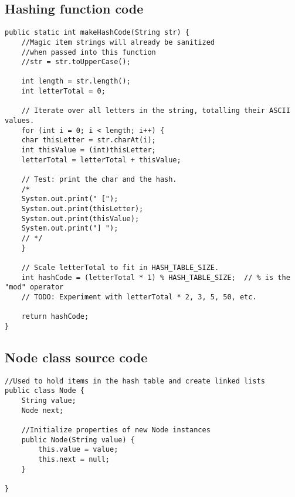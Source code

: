 \documentclass[letterpaper, 10pt,DIV=13]{scrartcl}
\numberwithin{equation}{section} %
\numberwithin{figure}{section} %
\numberwithin{table}{section} %
\begin{document}
\subsection{Hashing function code}
\lstset{numbers=left, numberstyle=\tiny, stepnumber=1, numbersep=5pt, basicstyle=\footnotesize\ttfamily}
\begin{lstlisting}[frame=single, ] 
public static int makeHashCode(String str) {
    //Magic item strings will already be sanitized 
    //when passed into this function
    //str = str.toUpperCase();
    
    int length = str.length();
    int letterTotal = 0;

    // Iterate over all letters in the string, totalling their ASCII values.
    for (int i = 0; i < length; i++) {
    char thisLetter = str.charAt(i);
    int thisValue = (int)thisLetter;
    letterTotal = letterTotal + thisValue;

    // Test: print the char and the hash.
    /*
    System.out.print(" [");
    System.out.print(thisLetter);
    System.out.print(thisValue);
    System.out.print("] ");
    // */
    }

    // Scale letterTotal to fit in HASH_TABLE_SIZE.
    int hashCode = (letterTotal * 1) % HASH_TABLE_SIZE;  // % is the "mod" operator
    // TODO: Experiment with letterTotal * 2, 3, 5, 50, etc.

    return hashCode;
}
\end{lstlisting}

\subsection{Node class source code}
\lstset{numbers=left, numberstyle=\tiny, stepnumber=1, numbersep=5pt, basicstyle=\footnotesize\ttfamily}
\begin{lstlisting}[frame=single, ] 
//Used to hold items in the hash table and create linked lists
public class Node {
    String value;
    Node next;
 
    //Initialize properties of new Node instances
    public Node(String value) {
        this.value = value;
        this.next = null;
    }

}
\end{lstlisting}
\end{document}
